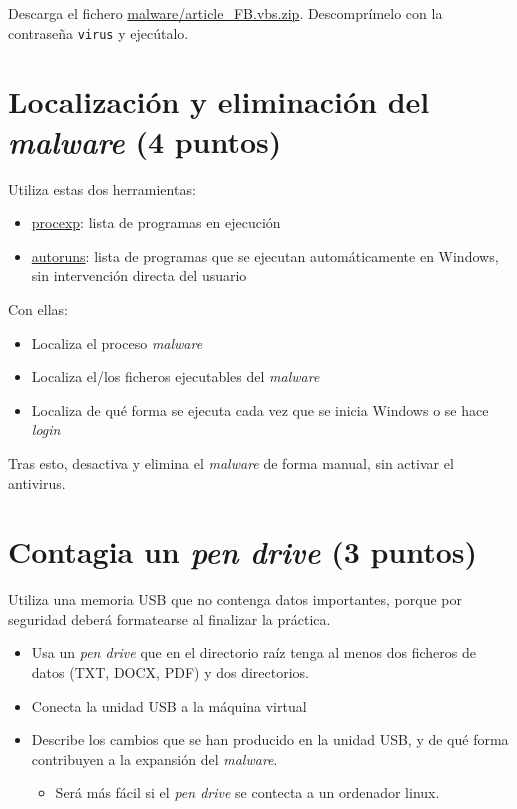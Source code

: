 \documentclass[a4paper]{article}
\begin{document}
Descarga el fichero \url{malware/article\_FB.vbs.zip}. Descomprímelo con la contraseña \texttt{virus} y ejecútalo.
\section{Localización y eliminación del \emph{malware} (4 puntos)}
\label{sec:org000000c}
Utiliza estas dos herramientas:
\begin{itemize}
\item \href{https://learn.microsoft.com/en-us/sysinternals/downloads/process-explorer}{procexp}: lista de programas en ejecución
\item \href{https://learn.microsoft.com/en-us/sysinternals/downloads/autoruns}{autoruns}: lista de programas que se ejecutan automáticamente en Windows, sin intervención directa del usuario
\end{itemize}


Con ellas:
\begin{itemize}
\item Localiza el proceso \emph{malware}
\item Localiza el/los ficheros ejecutables del \emph{malware}
\item Localiza de qué forma se ejecuta cada vez que se inicia Windows o se hace \emph{login}
\end{itemize}

Tras esto, desactiva y elimina el \emph{malware} de forma manual, sin activar el antivirus.
\section{Contagia un \emph{pen drive} (3 puntos)}
\label{sec:org000000f}
\begin{Aviso}[Precaución]
Utiliza una memoria USB que no contenga datos importantes, porque por seguridad deberá formatearse al finalizar la práctica.
\end{Aviso}

\begin{itemize}
\item Usa un \emph{pen drive} que en el directorio raíz tenga al menos dos ficheros de datos (TXT, DOCX, PDF) y dos directorios.
\item Conecta la unidad USB a la máquina virtual
\item Describe los cambios que se han producido en la unidad USB, y de qué forma contribuyen a la expansión del \emph{malware}.
\begin{itemize}
\item Será más fácil si el \emph{pen drive} se contecta a un ordenador linux.
\end{itemize}
\end{itemize}
\end{document}
